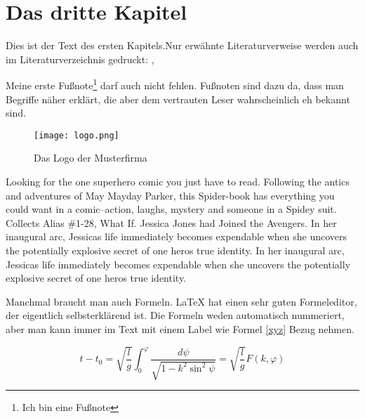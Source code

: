 
\chapter{Das dritte Kapitel}
Dies ist der Text des ersten Kapitels.Nur erwähnte Literaturverweise werden auch im Literaturverzeichnis gedruckt: \cite[S.12 ff]{baumgartner:2002}, \cite[S.1-3]{dreyfus:1980}

Meine erste Fußnote\footnote{Ich bin eine Fußnote} darf auch nicht fehlen. Fußnoten sind dazu da, dass man Begriffe näher erklärt, die aber dem vertrauten Leser wahrscheinlich eh bekannt sind.

\begin{figure}[h]
    \centering
    \texttt{[image: logo.png]}
    \caption{Das Logo der Musterfirma\footnotemark}
\end{figure}

Looking for the one superhero comic you just have to read. Following the antics and adventures of May Mayday Parker, this Spider-book has everything you could want in a comic--action, laughs, mystery and someone in a Spidey suit. Collects Alias \#1-28, What If. Jessica Jones had Joined the Avengers. In her inaugural arc, Jessicas life immediately becomes expendable when she uncovers the potentially explosive secret of one heros true identity. In her inaugural arc, Jessicas life immediately becomes expendable when she uncovers the potentially explosive secret of one heros true identity.

Manchmal braucht man auch Formeln. LaTeX hat einen sehr guten Formeleditor, der eigentlich selbsterklärend ist. Die Formeln weden automatisch nummeriert, aber man kann immer im Text mit einem Label wie Formel \ref{xyz} Bezug nehmen.

\begin{equation}
    t-t_{0}=\sqrt{\frac{l}{g}}\int_{0}^{\varphi}{\frac{d\psi}{\sqrt{1-k^{2}\sin^{2} {\psi}}}} = \sqrt{\frac{l}{g}} F(k,\varphi)
    \label{xyz}
\end{equation}

